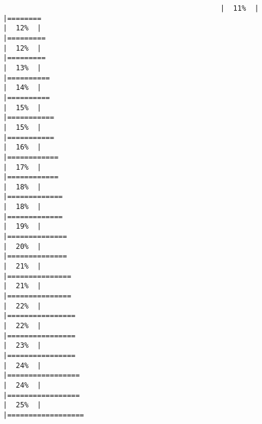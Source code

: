 \documentclass[
]{article}
\begin{document}
\begin{verbatim}
                                                   |  11%  |                                                                              |========                                                              |  12%  |                                                                              |=========                                                             |  12%  |                                                                              |=========                                                             |  13%  |                                                                              |==========                                                            |  14%  |                                                                              |==========                                                            |  15%  |                                                                              |===========                                                           |  15%  |                                                                              |===========                                                           |  16%  |                                                                              |============                                                          |  17%  |                                                                              |============                                                          |  18%  |                                                                              |=============                                                         |  18%  |                                                                              |=============                                                         |  19%  |                                                                              |==============                                                        |  20%  |                                                                              |==============                                                        |  21%  |                                                                              |===============                                                       |  21%  |                                                                              |===============                                                       |  22%  |                                                                              |================                                                      |  22%  |                                                                              |================                                                      |  23%  |                                                                              |================                                                      |  24%  |                                                                              |=================                                                     |  24%  |                                                                              |=================                                                     |  25%  |                                                                              |==================  
\end{verbatim}
\end{document}
